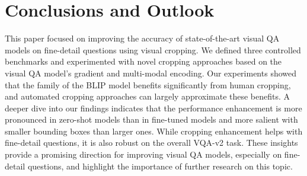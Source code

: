 \section{Conclusions and Outlook}


This paper focused on improving the accuracy of state-of-the-art visual QA models on fine-detail questions using visual cropping. We defined three controlled benchmarks and experimented with novel cropping approaches based on the visual QA model's gradient and multi-modal encoding. Our experiments showed that the family of the BLIP model benefits significantly from human cropping, and automated cropping approaches can largely approximate these benefits. A deeper dive into our findings indicates that the performance enhancement is more pronounced in zero-shot models than in fine-tuned models and more salient with smaller bounding boxes than larger ones. While cropping enhancement helps with fine-detail questions, it is also robust on the overall VQA-v2 task. These insights provide a promising direction for improving visual QA models, especially on fine-detail questions, and highlight the importance of further research on this topic. 

